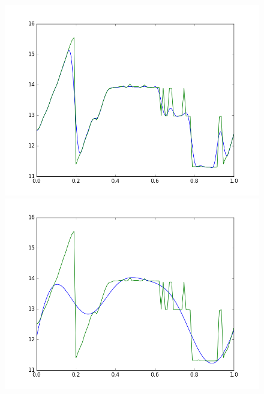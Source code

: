 \documentclass[]{jsarticle}
\begin{document}
\begin{figure}[htbp]
\begin{minipage}[b]{0.5\hsize}
  \includegraphics[scale=0.4]{./images/02gauss001c.png}
 \end{minipage}
 \begin{minipage}[b]{0.5\hsize}
  \includegraphics[scale=0.4]{./images/02gauss10p.png}
 \end{minipage}
 \begin{minipage}[b]{0.5\hsize}

\end{minipage}
\end{figure}
\end{document}
